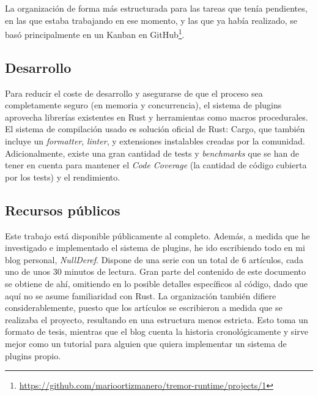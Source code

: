 La organización de forma más estructurada para las tareas que tenía pendientes,
en las que estaba trabajando en ese momento, y las que ya había realizado, se
basó principalmente en un Kanban en
GitHub\footnote{\url{https://github.com/marioortizmanero/tremor-runtime/projects/1}}.

\subsection{Desarrollo}

Para reducir el coste de desarrollo y asegurarse de que el proceso sea
completamente seguro (en memoria y concurrencia), el sistema de plugins
aprovecha librerías existentes en Rust y herramientas como macros procedurales.
El sistema de compilación usado es solución oficial de Rust: Cargo, que también
incluye un \emph{formatter}, \emph{linter}, y extensiones instalables creadas
por la comunidad. Adicionalmente, existe una gran cantidad de tests y
\emph{benchmarks} que se han de tener en cuenta para mantener el \emph{Code
Coverage} (la cantidad de código cubierta por los tests) y el rendimiento.

\subsection{Recursos públicos}

Este trabajo está disponible públicamente al completo. Además, a medida que he
investigado e implementado el sistema de plugins, he ido escribiendo todo en mi
blog personal, \emph{NullDeref}. Dispone de una serie con un total de 6
artículos, cada uno de unos 30 minutos de lectura. Gran parte del contenido de
este documento se obtiene de ahí, omitiendo en lo posible detalles específicos
al código, dado que aquí no se asume familiaridad con Rust. La organización
también difiere considerablemente, puesto que los artículos se escribieron a
medida que se realizaba el proyecto, resultando en una estructura menos
estricta. Esto toma un formato de tesis, mientras que el blog cuenta la historia
cronológicamente y sirve mejor como un tutorial para alguien que quiera
implementar un sistema de plugins propio.

